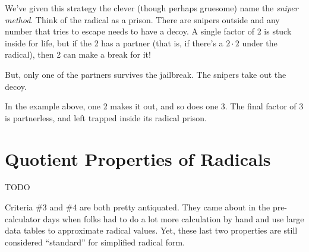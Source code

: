 We've given this strategy the clever (though perhaps gruesome) name the \textit{sniper method}. Think of the radical as a prison. There are snipers outside and any number that tries to escape needs to have a decoy. A single factor of 2 is stuck inside for life, but if the 2 has a partner (that is, if there's a $2 \cdot 2$ under the radical), then 2 can make a break for it!

But, only one of the partners survives the jailbreak. The snipers take out the decoy.

In the example above, one 2 makes it out, and so does one 3. The final factor of 3 is partnerless, and left trapped inside its radical prison.

%
%

\section{Quotient Properties of Radicals}
\label{sec:radquotient}

\begin{boxedexplore}
TODO
\end{boxedexplore}


Criteria \#3 and \#4 are both pretty antiquated. They came about in the pre-calculator days when folks had to do a lot more calculation by hand and use large data tables to approximate radical values. Yet, these last two properties are still considered ``standard'' for simplified radical form.

